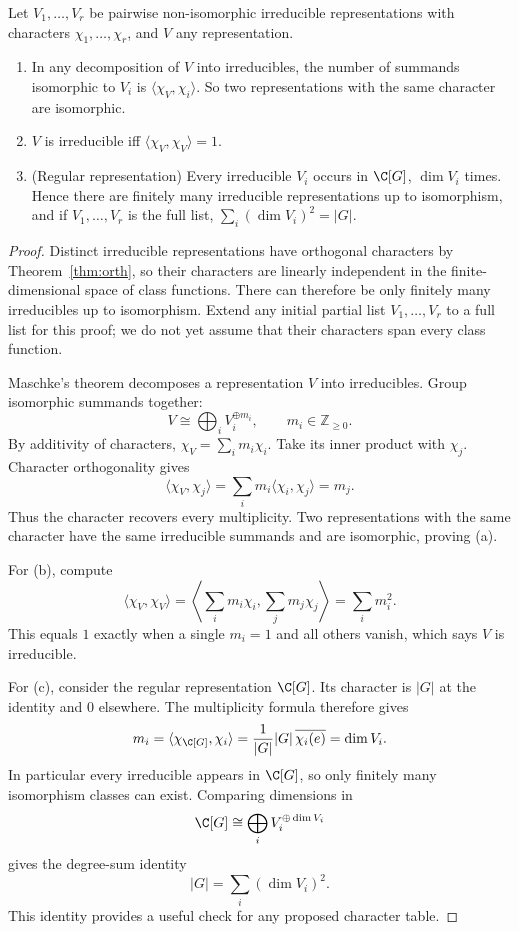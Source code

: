 \begin{corollary}\label{cor:mult}
Let $V_1,\dots,V_r$ be pairwise non-isomorphic irreducible representations with characters $\chi_1,\dots,\chi_r$, and $V$ any representation.
\begin{enumerate}[label=(\alph*)]
\item In any decomposition of $V$ into irreducibles, the number of summands isomorphic to $V_i$ is $\langle\chi_V,\chi_i\rangle$. So two representations with the same character are isomorphic.
\item $V$ is irreducible iff $\langle\chi_V,\chi_V\rangle=1$.
\item (Regular representation) Every irreducible $V_i$ occurs in $\C[G]$, $\dim V_i$ times. Hence there are finitely many irreducible representations up to isomorphism, and if $V_1,\dots,V_r$ is the full list, $\sum_i(\dim V_i)^2=|G|$.
\end{enumerate}
\end{corollary}
\begin{proof}
Distinct irreducible representations have orthogonal characters by
Theorem~\ref{thm:orth}, so their characters are linearly independent in
the finite-dimensional space of class functions. There can therefore be
only finitely many irreducibles up to isomorphism. Extend any initial
partial list $V_1,\ldots,V_r$ to a full list for this proof; we do not yet
assume that their characters span every class function.

Maschke's theorem decomposes a
representation $V$ into irreducibles.
Group isomorphic summands together:
\[
V\cong\bigoplus_i V_i^{\oplus m_i},
\qquad m_i\in\mathbb Z_{\ge0}.
\]
By additivity of characters,
$\chi_V=\sum_i m_i\chi_i$.
Take its inner product with $\chi_j$.
Character orthogonality gives
\[
\langle\chi_V,\chi_j\rangle
=\sum_i m_i\langle\chi_i,\chi_j\rangle
=m_j.
\]
Thus the character recovers every
multiplicity. Two representations
with the same character have the
same irreducible summands and
are isomorphic, proving (a).

For (b), compute
\[
\langle\chi_V,\chi_V\rangle
=\left\langle\sum_i m_i\chi_i,
                  \sum_j m_j\chi_j\right\rangle
=\sum_i m_i^2.
\]
This equals $1$ exactly when a
single $m_i=1$ and all others vanish,
which says $V$ is irreducible.

For (c), consider the regular
representation $\C[G]$. Its character
is $|G|$ at the identity and $0$
elsewhere. The multiplicity formula
therefore gives
\[
m_i=\langle\chi_{\C[G]},\chi_i\rangle
=\frac1{|G|}|G|\,\overline{\chi_i(e)}
=\dim V_i.
\]
In particular every irreducible
appears in $\C[G]$, so only finitely
many isomorphism classes can exist.
Comparing dimensions in
\[
\C[G]\cong\bigoplus_i
V_i^{\oplus\dim V_i}
\]
gives the degree-sum identity
\[
\boxed{|G|=\sum_i(\dim V_i)^2}.
\]
This identity provides a useful
check for any proposed character table.
\end{proof}

